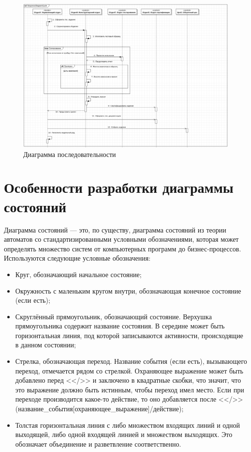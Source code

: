 \documentclass[a4paper,12pt]{extreport}
\begin{document}
\begin{figure}[h!]
	\centering
	\includegraphics[width=1\linewidth]{images/sequence}
	\caption{Диаграмма последовательности}
	\label{fig:sequence}
\end{figure}
\newpage
\section{Особенности разработки диаграммы состояний}
Диаграмма состояний --- это, по существу, диаграмма состояний из теории автоматов со стандартизированными условными обозначениями, которая может определять множество систем от компьютерных программ до бизнес-процессов. Используются следующие условные обозначения:
\begin{itemize}
	\item Круг, обозначающий начальное состояние;
	\item Окружность с маленьким кругом внутри, обозначающая конечное состояние (если есть);
	\item Скруглённый прямоугольник, обозначающий состояние. Верхушка прямоугольника содержит название состояния. В середине может быть горизонтальная линия, под которой записываются активности, происходящие в данном состоянии;
	\item Стрелка, обозначающая переход. Название события (если есть), вызывающего переход, отмечается рядом со стрелкой. Охраняющее выражение может быть добавлено перед <</>> и заключено в квадратные скобки, что значит, что это выражение должно быть истинным, чтобы переход имел место. Если при переходе производится какое-то действие, то оно добавляется после <</>> (название\_события[охраняющее\_выражение]/действие);
	\item Толстая горизонтальная линия с либо множеством входящих линий и одной выходящей, либо одной входящей линией и множеством выходящих. Это обозначает объединение и разветвление соответственно.
\end{itemize}
\end{document}
